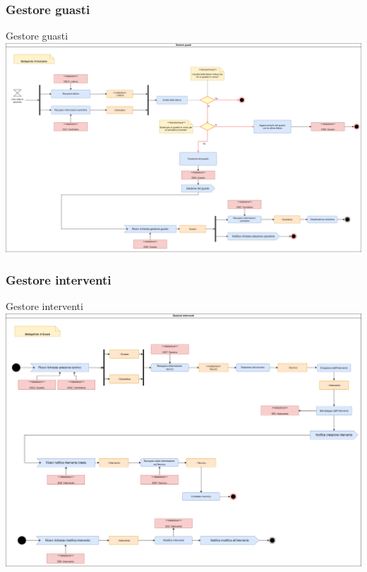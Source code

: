 \documentclass{beamer}
\begin{document}
	\begin{frame}
		\subsubsection{Gestore guasti}	
		\begin{block}{Gestore guasti}
			\includegraphics[width=\textwidth, height=0.85\textheight, keepaspectratio=true]{comp2.png}
		\end{block}
	\end{frame}	
	
	\begin{frame}
		\subsubsection{Gestore interventi}	
		\begin{block}{Gestore interventi}
			\includegraphics[width=\textwidth, height=0.85\textheight, keepaspectratio=true]{comp3.png}
		\end{block}
	\end{frame}	
	
\end{document}
